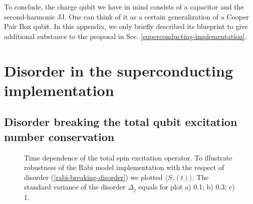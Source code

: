 \documentclass[reprint, aps, prx, amsmath, amssymb, longbibliography, superscriptaddress]{revtex4-2}
\begin{document}
To conclude, the charge qubit we have in mind consists of a capacitor and the second-harmonic JJ. One can think of it as a certain generalization of a Cooper Pair Box qubit. In this appendix, we only briefly described its blueprint to give additional substance to the proposal in Sec. \ref{superconducting-implementation}.


\section{Disorder in the superconducting implementation}
\label{app:disorder}
\subsection{Disorder breaking the total qubit excitation number conservation}


\begin{figure}[th]
    \captionsetup[subfloat]{captionskip=-135pt} %
    \centering
    \caption{Time dependence of the total spin excitation operator. To illustrate robustness of the Rabi model implementation with the respect of disorder (\ref{rabi-breaking-disorder}) we plotted $\langle S_z(t) \rangle$. The standard variance of the disorder $\Delta_j$ equals for plot a) 0.1; b) 0.3; c) 1.}
    \label{fig:spin-excitation-plot}
\end{figure}
\end{document}
